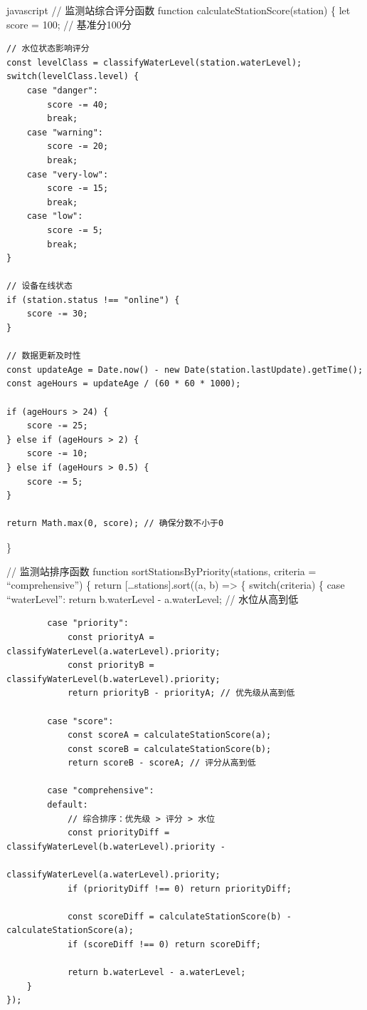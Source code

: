 javascript // 监测站综合评分函数 function calculateStationScore(station) \{ let score = 100; // 基准分100分

\begin{verbatim}
// 水位状态影响评分
const levelClass = classifyWaterLevel(station.waterLevel);
switch(levelClass.level) {
    case "danger":
        score -= 40;
        break;
    case "warning": 
        score -= 20;
        break;
    case "very-low":
        score -= 15;
        break;
    case "low":
        score -= 5;
        break;
}

// 设备在线状态
if (station.status !== "online") {
    score -= 30;
}

// 数据更新及时性
const updateAge = Date.now() - new Date(station.lastUpdate).getTime();
const ageHours = updateAge / (60 * 60 * 1000);

if (ageHours > 24) {
    score -= 25;
} else if (ageHours > 2) {
    score -= 10;
} else if (ageHours > 0.5) {
    score -= 5;
}

return Math.max(0, score); // 确保分数不小于0
\end{verbatim}

\}

// 监测站排序函数 function sortStationsByPriority(stations, criteria = ``comprehensive'') \{ return {[}\ldots stations{]}.sort((a, b) =\textgreater{} \{ switch(criteria) \{ case ``waterLevel'': return b.waterLevel - a.waterLevel; // 水位从高到低

\begin{verbatim}
        case "priority":
            const priorityA = classifyWaterLevel(a.waterLevel).priority;
            const priorityB = classifyWaterLevel(b.waterLevel).priority;
            return priorityB - priorityA; // 优先级从高到低
            
        case "score":
            const scoreA = calculateStationScore(a);
            const scoreB = calculateStationScore(b);
            return scoreB - scoreA; // 评分从高到低
            
        case "comprehensive":
        default:
            // 综合排序：优先级 > 评分 > 水位
            const priorityDiff = classifyWaterLevel(b.waterLevel).priority - 
                               classifyWaterLevel(a.waterLevel).priority;
            if (priorityDiff !== 0) return priorityDiff;
            
            const scoreDiff = calculateStationScore(b) - calculateStationScore(a);
            if (scoreDiff !== 0) return scoreDiff;
            
            return b.waterLevel - a.waterLevel;
    }
});
\end{verbatim}

